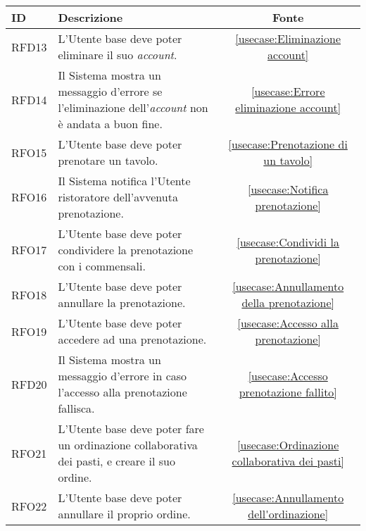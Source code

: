 \begin{table}[H]
	\renewcommand{\arraystretch}{1.5}
	\centering
	\begin{tabularx}{\textwidth}{l|X|c}
		\textbf{ID} & \textbf{Descrizione}                                                                                      & \textbf{Fonte}                                               \\
		\hline
		RFD13       & L'Utente base deve poter eliminare il suo \textit{account}.                                               & \autoref{usecase:Eliminazione account}                       \\
		\hline
		RFD14       & Il Sistema mostra un messaggio d'errore se l'eliminazione dell'\textit{account} non è andata a buon fine. & \autoref{usecase:Errore eliminazione account}                \\
		\hline
		RFO15       & L'Utente base deve poter prenotare un tavolo.                                                             & \autoref{usecase:Prenotazione di un tavolo}                  \\
		\hline
		RFO16       & Il Sistema notifica l'Utente ristoratore dell'avvenuta prenotazione.                                      & \autoref{usecase:Notifica prenotazione}                      \\
		\hline
		RFO17       & L'Utente base deve poter condividere la prenotazione con i commensali.                                    & \autoref{usecase:Condividi la prenotazione}                  \\
		\hline
		RFO18       & L'Utente base deve poter annullare la prenotazione.                                                       & \autoref{usecase:Annullamento della prenotazione}            \\
		\hline
		RFO19       & L'Utente base deve poter accedere ad una prenotazione.                                                    & \autoref{usecase:Accesso alla prenotazione}                  \\
		\hline
		RFD20       & Il Sistema mostra un messaggio d'errore in caso l'accesso alla prenotazione fallisca.                     & \autoref{usecase:Accesso prenotazione fallito}               \\
		\hline
		RFO21       & L'Utente base deve poter fare un ordinazione collaborativa dei pasti, e creare il suo ordine.             & \autoref{usecase:Ordinazione collaborativa dei pasti}        \\
		\hline
		RFO22       & L'Utente base deve poter annullare il proprio ordine.                                                     & \autoref{usecase:Annullamento dell'ordinazione}              \\

\end{tabularx}
\end{table}
